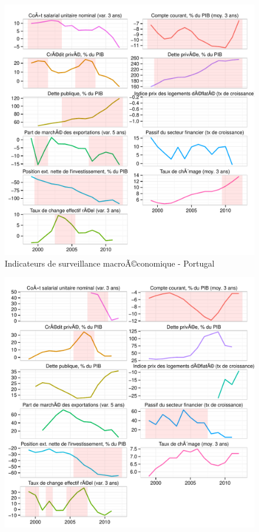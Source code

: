 \documentclass{article}\usepackage[]{graphicx}\usepackage[]{color}
\makeatletter
\def\maxwidth{ %
  \ifdim\Gin@nat@width>\linewidth
    \linewidth
  \else
    \Gin@nat@width
  \fi
}
\newenvironment{knitrout}{}{} %
\makeatother
\begin{document}
\begin{knitrout}
\begin{figure}[p]
{\centering \includegraphics[width=\maxwidth]{figure_graph/byco23} 

}

\caption[Indicateurs de surveillance macroÃ©conomique - Portugal]{Indicateurs de surveillance macroÃ©conomique - Portugal\label{fig:byco23}}
\end{figure}

\begin{figure}[p]


{\centering \includegraphics[width=\maxwidth]{figure_graph/byco24} 

}
\end{figure}
\end{knitrout}
\end{document}
